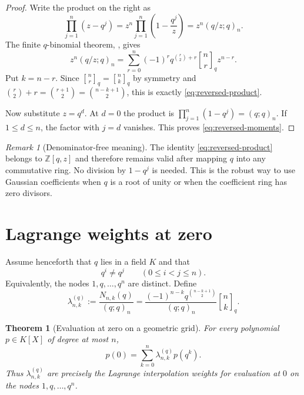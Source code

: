 \documentclass[11pt,oneside,openany]{book}
\newtheorem{theorem}{Theorem}[chapter]
\theoremstyle{definition}
\theoremstyle{remark}
\newtheorem{remark}[remark]{Remark}
\newcommand{\qbinom}[2]{\genfrac{[}{]}{0pt}{}{#1}{#2}_{q}}
\newcommand{\Z}{\mathbb Z}
\begin{document}
\begin{proof}
Write the product on the right as
\[
 \prod_{j=1}^{n}(z-q^j)
 =z^n\prod_{j=1}^{n}\left(1-\frac{q^j}{z}\right)
 =z^n(q/z;q)_n.
\]
The finite $q$-binomial theorem, , gives
\[
 z^n(q/z;q)_n
 =\sum_{r=0}^{n}(-1)^r q^{\binom r2+r}\qbinom nr z^{n-r}.
\]
Put $k=n-r$.  Since $\qbinom nr=\qbinom nk$ by symmetry and
$\binom r2+r=\binom{r+1}{2}=\binom{n-k+1}{2}$, this is exactly
\eqref{eq:reversed-product}.

Now substitute $z=q^d$.  At $d=0$ the product is
$\prod_{j=1}^{n}(1-q^j)=(q;q)_n$.  If $1\le d\le n$, the factor with
$j=d$ vanishes.  This proves \eqref{eq:reversed-moments}.
\end{proof}

\begin{remark}[Denominator-free meaning]\label{rem:denominator-free-reversed}
The identity \eqref{eq:reversed-product} belongs to $\Z[q,z]$ and therefore remains valid after mapping $q$ into any commutative ring.  No division by $1-q^j$ is needed.  This is the robust way to use Gaussian coefficients when $q$ is a root of unity or when the coefficient ring has zero divisors.
\end{remark}

\section{Lagrange weights at zero}

Assume henceforth that $q$ lies in a field $K$ and that
\[
 q^i\ne q^j\qquad(0\le i<j\le n).
\]
Equivalently, the nodes $1,q,\ldots,q^n$ are distinct.  Define
\begin{equation}\label{eq:geometric-lagrange-weight}
 \lambda_{n,k}^{(q)}
 :=\frac{N_{n,k}(q)}{(q;q)_n}
 =\frac{(-1)^{n-k}q^{\binom{n-k+1}{2}}}{(q;q)_n}\qbinom nk.
\end{equation}

\begin{theorem}[Evaluation at zero on a geometric grid]\label{thm:geometric-evaluation-zero}
For every polynomial $p\in K[X]$ of degree at most $n$,
\begin{equation}\label{eq:geometric-eval-zero}
 p(0)=\sum_{k=0}^{n}\lambda_{n,k}^{(q)}p(q^k).
\end{equation}
Thus $\lambda_{n,k}^{(q)}$ are precisely the Lagrange interpolation weights for evaluation at $0$ on the nodes $1,q,\ldots,q^n$.
\end{theorem}
\end{document}
